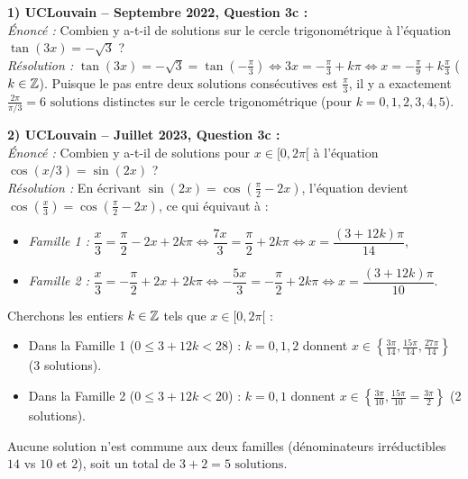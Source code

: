 \begin{exemple}
\textbf{1) UCLouvain -- Septembre 2022, Question 3c :}\\
\emph{Énoncé :} Combien y a-t-il de solutions sur le cercle trigonométrique à l'équation $\tan(3x) = -\sqrt{3}$ ?\\
\emph{Résolution :} $\tan(3x) = -\sqrt{3} = \tan\left(-\frac{\pi}{3}\right) \iff 3x = -\frac{\pi}{3} + k\pi \iff x = -\frac{\pi}{9} + k\frac{\pi}{3}$ ($k \in \mathbb{Z}$).
Puisque le pas entre deux solutions consécutives est $\frac{\pi}{3}$, il y a exactement $\frac{2\pi}{\pi/3} = \boxed{6 \text{ solutions}}$ distinctes sur le cercle trigonométrique (pour $k = 0, 1, 2, 3, 4, 5$).

\medskip
\textbf{2) UCLouvain -- Juillet 2023, Question 3c :}\\
\emph{Énoncé :} Combien y a-t-il de solutions pour $x \in [0, 2\pi[$ à l'équation $\cos(x/3) = \sin(2x)$ ?\\
\emph{Résolution :} En écrivant $\sin(2x) = \cos\left(\frac{\pi}{2} - 2x\right)$, l'équation devient $\cos\left(\frac{x}{3}\right) = \cos\left(\frac{\pi}{2} - 2x\right)$, ce qui équivaut à :
\begin{itemize}
    \item \emph{Famille 1 :} $\dfrac{x}{3} = \dfrac{\pi}{2} - 2x + 2k\pi \iff \dfrac{7x}{3} = \dfrac{\pi}{2} + 2k\pi \iff x = \dfrac{(3 + 12k)\pi}{14}$,
    \item \emph{Famille 2 :} $\dfrac{x}{3} = -\dfrac{\pi}{2} + 2x + 2k\pi \iff -\dfrac{5x}{3} = -\dfrac{\pi}{2} + 2k\pi \iff x = \dfrac{(3 + 12k)\pi}{10}$.
\end{itemize}
Cherchons les entiers $k \in \mathbb{Z}$ tels que $x \in [0, 2\pi[$ :
\begin{itemize}
    \item Dans la Famille 1 ($0 \le 3 + 12k < 28$) : $k = 0, 1, 2$ donnent $x \in \left\{\frac{3\pi}{14}, \frac{15\pi}{14}, \frac{27\pi}{14}\right\}$ (3 solutions).
    \item Dans la Famille 2 ($0 \le 3 + 12k < 20$) : $k = 0, 1$ donnent $x \in \left\{\frac{3\pi}{10}, \frac{15\pi}{10} = \frac{3\pi}{2}\right\}$ (2 solutions).
\end{itemize}
Aucune solution n'est commune aux deux familles (dénominateurs irréductibles $14$ vs $10$ et $2$), soit un total de $3 + 2 = \boxed{5 \text{ solutions}}$.


\end{exemple}
